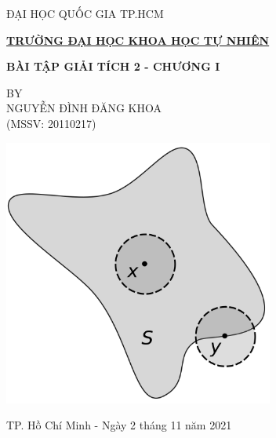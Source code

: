 
\thispagestyle{empty}
\begin{tcolorbox}
\begin{center}

\vspace{1.2cm}
\centerline{ĐẠI HỌC QUỐC GIA TP.HCM}
\centerline{\bf\underline{TRƯỜNG ĐẠI HỌC KHOA HỌC TỰ NHIÊN}}
\vspace{2.5cm}

{\huge\textbf{
BÀI TẬP GIẢI TÍCH 2 - CHƯƠNG I}}

\vspace{0.5cm}

\normalsize
\small BY\\[0.6em]
\Large NGUYỄN ĐÌNH ĐĂNG KHOA\\
\Large (MSSV: 20110217)

\vspace{2.8cm}

\includegraphics[width=3.5in]{./assets/interior-bw}

\vspace{2.8cm}

\normalsize
TP. Hồ Chí Minh - Ngày 2 tháng 11 năm 2021
\vspace{1.5cm}

\end{center}
\end{tcolorbox}

\pagebreak
\clearpage
\restoregeometry
